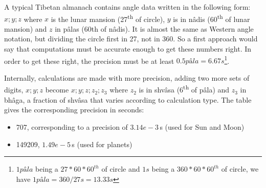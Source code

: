 


A typical Tibetan almanach contains angle data written in the following form: $x;y;z$ where $x$ is the lunar mansion (27\textsuperscript{th} of circle), $y$ is in nâdis (60\textsuperscript{th} of lunar mansion) and $z$ in pâlas (60th of nâdis). It is almost the same as Western angle notation, but dividing the circle first in 27, not in 360. So a first approach would say that computations must be accurate enough to get these numbers right. In order to get these right, the precision must be at least $0.5 pâla = 6.67 s$\footnote{$1 pâla$ being a $27*60*60^{th}$ of circle and $1s$ being a $360*60*60^{th}$ of circle, we have $1 pâla = 360/27 s = 13.33 s$}.

Internally, calculations are made with more precision, adding two more sets of digits, $x;y;z$ become $x;y;z;z_2;z_3$ where $z_2$ is in shvâsa (6\textsuperscript{th} of pâla) and $z_3$ in bhâga, a fraction of shvâsa that varies according to calculation type. The table \TODO gives the corresponding precision in seconds:
\begin{itemize}
\item 707, corresponding to a precision of $3.14e-3$\,s (used for Sun and Moon)
\item 149209, $1.49e-5$\,s (used for planets)
\end{itemize}


